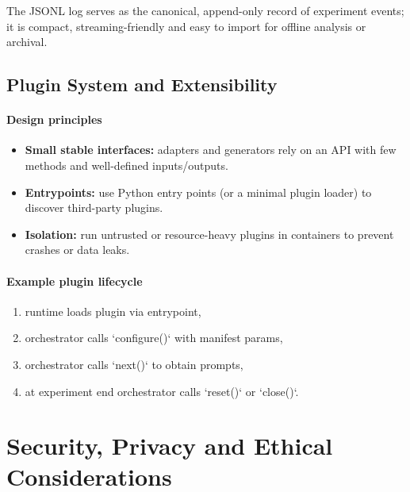 The JSONL log serves as the canonical, append-only record of experiment events; it is compact, streaming-friendly and easy to import for offline analysis or archival.

\subsection{Plugin System and Extensibility}\label{subsec:plugin-system}

\paragraph{Design principles}
\begin{itemize}
  \item \textbf{Small stable interfaces:} adapters and generators rely on an API with few methods and well-defined inputs/outputs.
  \item \textbf{Entrypoints:} use Python entry points (or a minimal plugin loader) to discover third-party plugins.
  \item \textbf{Isolation:} run untrusted or resource-heavy plugins in containers to prevent crashes or data leaks.
\end{itemize}

\paragraph{Example plugin lifecycle}
\begin{enumerate}
  \item runtime loads plugin via entrypoint,
  \item orchestrator calls `configure()` with manifest params,
  \item orchestrator calls `next()` to obtain prompts,
  \item at experiment end orchestrator calls `reset()` or `close()`.
\end{enumerate}

\section{Security, Privacy and Ethical Considerations}\label{sec:security-privacy-ethics}

